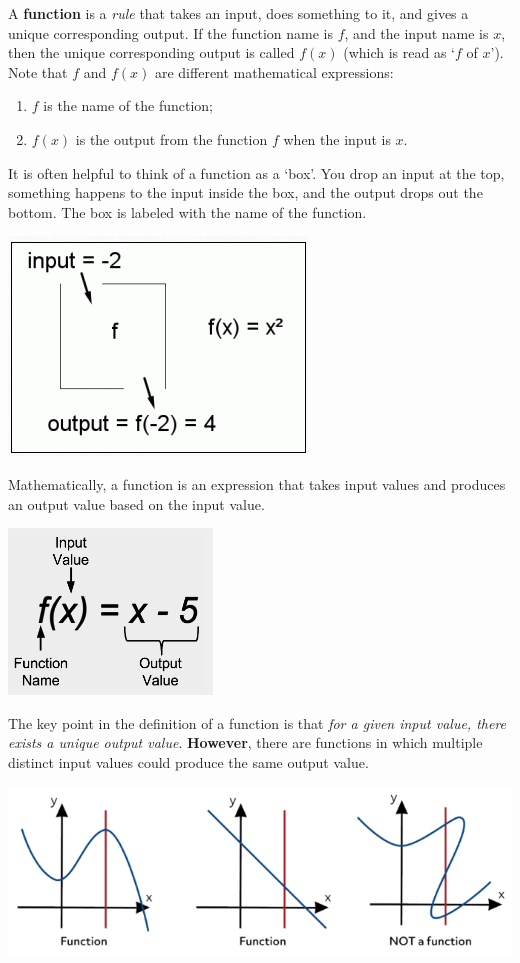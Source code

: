 \documentclass[
]{book}
\begin{document}
A \textbf{function} is a \emph{rule} that takes an input, does something to it, and gives a unique corresponding output. If the function name is \(f\), and the input name is \(x\), then the unique corresponding output is called \(f(x)\) (which is read as `\(f\) of \(x\)'). Note that \(f\) and \(f(x)\) are different mathematical expressions:

\begin{enumerate}
\def\labelenumi{\arabic{enumi}.}
\item
  \(f\) is the name of the function;
\item
  \(f(x)\) is the output from the function \(f\) when the input is \(x\).
\end{enumerate}

It is often helpful to think of a function as a `box'. You drop an input at the top, something happens to the input inside the box, and the output drops out the bottom. The box is labeled with the name of the function.

\begin{center}\includegraphics[width=0.3\linewidth]{img01/w01note01-functionDef} \end{center}

Mathematically, a function is an expression that takes input values and produces an output value based on the input value.

\begin{center}\includegraphics[width=0.15\linewidth]{img01/w01note02-AlgebraicRepresentationFun} \end{center}

The key point in the definition of a function is that \emph{for a given input value, there exists a unique output value}. \textbf{However}, there are functions in which multiple distinct input values could produce the same output value.

\begin{center}\includegraphics[width=0.65\linewidth]{img01/w01note04-verticalTestFun} \end{center}
\end{document}
